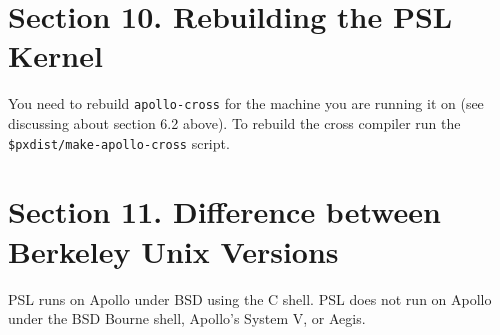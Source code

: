 \section{Section 10. Rebuilding the PSL Kernel}

You need to rebuild {\tt apollo-cross} for the machine you are running
it on (see discussing about section 6.2 above).  To rebuild the cross
compiler run the {\tt \$pxdist/make-apollo-cross} script.

\section{Section 11. Difference between Berkeley Unix Versions}

PSL runs on Apollo under BSD using the C shell.  PSL does not run
on Apollo under the BSD Bourne shell, Apollo's System V, or Aegis.


